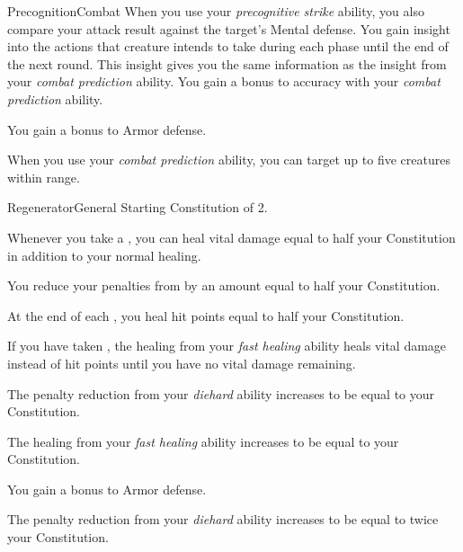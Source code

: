 \begin{feat}{Precognition}{Combat}
         When you use your \textit{precognitive strike} ability, you also compare your attack result against the target's Mental defense.
        \hit You gain insight into the actions that creature intends to take during each phase until the end of the next round.
        This insight gives you the same information as the insight from your \textit{combat prediction} ability.
        You gain a  bonus to accuracy with your \textit{combat prediction} ability.

         You gain a  bonus to Armor defense. 

         When you use your \textit{combat prediction} ability, you can target up to five creatures within range.
    \end{feat}

    \begin{feat}{Regenerator}{General}
        \featpre Starting Constitution of 2.

         Whenever you take a , you can heal vital damage equal to half your Constitution in addition to your normal healing.

         You reduce your penalties from  by an amount equal to half your Constitution.

         At the end of each , you heal hit points equal to half your Constitution.

         If you have taken , the healing from your \textit{fast healing} ability heals vital damage instead of hit points until you have no vital damage remaining.

         The penalty reduction from your \textit{diehard} ability increases to be equal to your Constitution.

         The healing from your \textit{fast healing} ability increases to be equal to your Constitution.

         You gain a  bonus to Armor defense.

         The penalty reduction from your \textit{diehard} ability increases to be equal to twice your Constitution.
    \end{feat}

